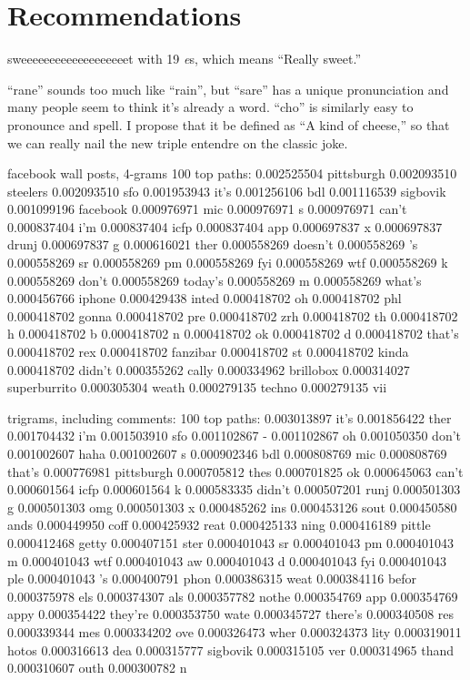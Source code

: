 \documentclass[twocolumn]{article}
\begin{document}



\section{Recommendations}

sweeeeeeeeeeeeeeeeeeet with 19 {\it e}s, which means ``Really sweet.''

``rane'' sounds too much like ``rain'', but ``sare'' has a unique pronunciation and many people seem to think it's already a word. ``cho'' is similarly easy to pronounce and spell. I propose that it be defined as ``A kind of cheese,'' so that we can really nail the new triple entendre on the classic joke.

facebook wall posts, 4-grams
100 top paths:
0.002525504 pittsburgh
0.002093510 steelers
0.002093510 sfo
0.001953943 it's
0.001256106 bdl
0.001116539 sigbovik
0.001099196 facebook
0.000976971 mic
0.000976971 s
0.000976971 can't
0.000837404 i'm
0.000837404 icfp
0.000837404 app
0.000697837 x
0.000697837 drunj
0.000697837 g
0.000616021 ther
0.000558269 doesn't
0.000558269 's
0.000558269 sr
0.000558269 pm
0.000558269 fyi
0.000558269 wtf
0.000558269 k
0.000558269 don't
0.000558269 today's
0.000558269 m
0.000558269 what's
0.000456766 iphone
0.000429438 inted
0.000418702 oh
0.000418702 phl
0.000418702 gonna
0.000418702 pre
0.000418702 zrh
0.000418702 th
0.000418702 h
0.000418702 b
0.000418702 n
0.000418702 ok
0.000418702 d
0.000418702 that's
0.000418702 rex
0.000418702 fanzibar
0.000418702 st
0.000418702 kinda
0.000418702 didn't
0.000355262 cally
0.000334962 brillobox
0.000314027 superburrito
0.000305304 weath
0.000279135 techno
0.000279135 vii


trigrams, including comments:
100 top paths:
0.003013897 it's
0.001856422 ther
0.001704432 i'm
0.001503910 sfo
0.001102867 -
0.001102867 oh
0.001050350 don't
0.001002607 haha
0.001002607 s
0.000902346 bdl
0.000808769 mic
0.000808769 that's
0.000776981 pittsburgh
0.000705812 thes
0.000701825 ok
0.000645063 can't
0.000601564 icfp
0.000601564 k
0.000583335 didn't
0.000507201 runj
0.000501303 g
0.000501303 omg
0.000501303 x
0.000485262 ins
0.000453126 sout
0.000450580 ands
0.000449950 coff
0.000425932 reat
0.000425133 ning
0.000416189 pittle
0.000412468 getty
0.000407151 ster
0.000401043 sr
0.000401043 pm
0.000401043 m
0.000401043 wtf
0.000401043 aw
0.000401043 d
0.000401043 fyi
0.000401043 ple
0.000401043 's
0.000400791 phon
0.000386315 weat
0.000384116 befor
0.000375978 els
0.000374307 als
0.000357782 nothe
0.000354769 app
0.000354769 appy
0.000354422 they're
0.000353750 wate
0.000345727 there's
0.000340508 res
0.000339344 mes
0.000334202 ove
0.000326473 wher
0.000324373 lity
0.000319011 hotos
0.000316613 dea
0.000315777 sigbovik
0.000315105 ver
0.000314965 thand
0.000310607 outh
0.000300782 n
\end{document}
